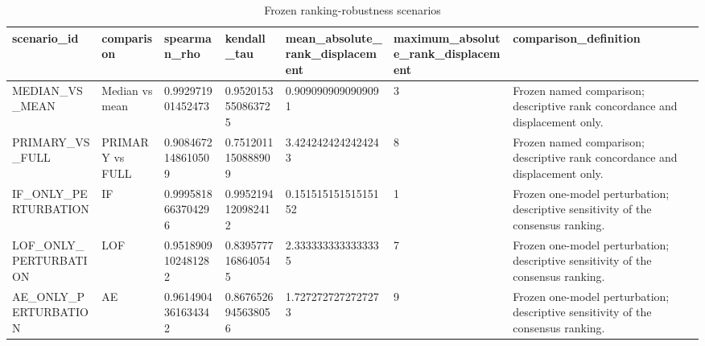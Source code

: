 \begin{longtable}{lllllll}
\caption{Frozen ranking-robustness scenarios}\\
\hline
scenario\_id & comparison & spearman\_rho & kendall\_tau & mean\_absolute\_rank\_displacement & maximum\_absolute\_rank\_displacement & comparison\_definition \\
\hline
MEDIAN\_VS\_MEAN & Median vs mean & 0.992971901452473 & 0.9520153550863725 & 0.9090909090909091 & 3 & Frozen named comparison; descriptive rank concordance and displacement only. \\
PRIMARY\_VS\_FULL & PRIMARY vs FULL & 0.9084672148610509 & 0.7512011150888909 & 3.4242424242424243 & 8 & Frozen named comparison; descriptive rank concordance and displacement only. \\
IF\_ONLY\_PERTURBATION & IF & 0.9995818663704296 & 0.9952194120982412 & 0.15151515151515152 & 1 & Frozen one-model perturbation; descriptive sensitivity of the consensus ranking. \\
LOF\_ONLY\_PERTURBATION & LOF & 0.9518909102481282 & 0.8395777168640545 & 2.3333333333333335 & 7 & Frozen one-model perturbation; descriptive sensitivity of the consensus ranking. \\
AE\_ONLY\_PERTURBATION & AE & 0.9614904361634342 & 0.8676526945638056 & 1.7272727272727273 & 9 & Frozen one-model perturbation; descriptive sensitivity of the consensus ranking. \\
\hline
\end{longtable}
